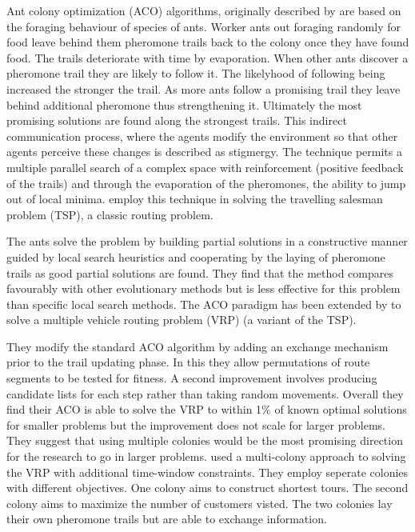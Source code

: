Ant colony optimization (ACO) algorithms, originally described by \citet{dorigo92optimization} are based on the foraging behaviour of species of ants. Worker ants out foraging randomly for food leave behind them pheromone trails back to the colony once they have found food. The trails deteriorate with time by evaporation. When other ants discover a pheromone trail they are likely to follow it. The likelyhood of following being increased the stronger the trail. As more ants follow a promising trail they leave behind additional pheromone thus strengthening it. Ultimately the most promising solutions are found along the strongest trails. This indirect communication process, where the agents modify the environment so that other agents perceive these changes is described as stigmergy. The technique permits a multiple parallel search of a complex space with reinforcement (positive feedback of the trails) and through the evaporation of the pheromones, the ability to jump out of local minima. \citet{dorigo95ant} employ this technique in solving the travelling salesman problem (TSP), a classic routing problem. 

The ants solve the problem by building partial solutions in a constructive manner guided by local search heuristics and cooperating by the laying of pheromone trails as good partial solutions are found. They find that the method compares favourably with other evolutionary methods but is less effective for this problem than specific local search methods. The ACO paradigm has been extended by \citet{bell04ant} to solve a multiple vehicle routing problem (VRP) (a variant of the TSP). 

They modify the standard ACO algorithm by adding an exchange mechanism prior to the trail updating phase. In this they allow permutations of route segments to be tested for fitness. A second improvement involves producing candidate lists for each step rather than taking random movements. Overall they find their ACO is able to solve the VRP to within 1\% of known optimal solutions for smaller problems but the improvement does not scale for larger problems. They suggest that using multiple colonies would be the most promising direction for the research to go in larger problems. \citet{gambardella99multiple} used a multi-colony approach to solving the VRP with additional time-window constraints. They employ seperate colonies with different objectives. One colony aims to construct shortest tours. The second colony aims to maximize the number of customers visted. The two colonies lay their own pheromone trails but are able to exchange information.

